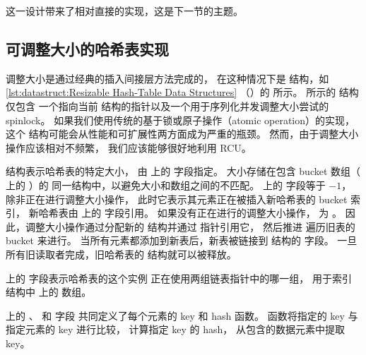 这一设计带来了相对直接的实现，这是下一节的主题。

\subsection{可调整大小的哈希表实现}
\label{sec:datastruct:Resizable Hash Table Implementation}

\begin{fcvref}
调整大小是通过经典的插入间接层方法完成的，
在这种情况下是  结构，如
\cref{lst:datastruct:Resizable Hash-Table Data Structures}
（）的
 所示。
 所示的  结构仅包含
一个指向当前  结构的指针以及一个用于序列化并发调整大小尝试的 spinlock。
如果我们使用传统的基于锁或原子操作（atomic operation）的实现，
这个  结构可能会从性能和可扩展性两方面成为严重的瓶颈。
然而，由于调整大小操作应该相对不频繁，
我们应该能够很好地利用 RCU\@。

\begin{listing}

\caption{可调整大小的 Hash-Table 数据结构}
\label{lst:datastruct:Resizable Hash-Table Data Structures}
\end{listing}

 结构表示哈希表的特定大小，
由  上的  字段指定。
大小存储在包含 bucket 数组（ 上的 ）的
同一结构中，以避免大小和数组之间的不匹配。
 上的  字段等于 $-1$，
除非正在进行调整大小操作，
此时它表示其元素正在被插入新哈希表的 bucket 索引，
新哈希表由  上的  字段引用。
如果没有正在进行的调整大小操作， 为 。
因此，调整大小操作通过分配新的  结构并通过  指针引用它，
然后推进  遍历旧表的 bucket 来进行。
当所有元素都添加到新表后，新表被链接到  结构的  字段。
一旦所有旧读取者完成，旧哈希表的  结构就可以被释放。

 上的  字段表示哈希表的这个实例
正在使用两组链表指针中的哪一组，
用于索引  结构中  上的
 数组。

 上的
、 和  字段
共同定义了每个元素的 key 和 hash 函数。
 函数将指定的 key 与指定元素的 key 进行比较，
 计算指定 key 的 hash，
 从包含的数据元素中提取 key。


\end{fcvref}
